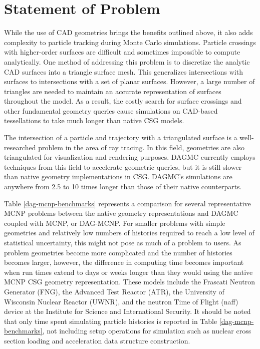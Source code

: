 \section{Statement of Problem}\label{sec:problem-statement}

While the use of CAD geometries brings the benefits outlined above, it also adds
complexity to particle tracking during Monte Carlo simulations. Particle
crossings with higher-order surfaces are difficult and sometimes impossible to
compute analytically. One method of addressing this problem is to discretize the
analytic CAD surfaces into a triangle surface mesh. This generalizes
intersections with surfaces to intersections with a set of planar
surfaces. However, a large number of triangles are needed to maintain an
accurate representation of surfaces throughout the model. As a result, the
costly search for surface crossings and other fundamental geometry
queries cause simulations on CAD-based tessellations
to take much longer than native CSG models.

The intersection of a particle and trajectory with a triangulated surface is a
well-researched problem in the area of ray tracing. In this field, geometries
are also triangulated for visualization and rendering purposes. DAGMC currently
employs techniques from this field to accelerate geometric queries, but it is
still slower than native geometry implementations in CSG. DAGMC's simulations
are anywhere from 2.5 to 10 times longer than those of their native
counterparts.

Table \ref{dag-mcnp-benchmarks} represents a comparison for several
representative MCNP problems between the native geometry representations and
DAGMC coupled with MCNP, or DAG-MCNP. For smaller problems with simple
geometries and relatively low numbers of histories required to reach a low level
of statistical uncertainty, this might not pose as much of a problem to
users. As problem geometries become more complicated and the number of histories
becomes larger, however, the difference in computing time becomes important when
run times extend to days or weeks longer than they would using the native MCNP
CSG geometry representation. These models include the Frascati Neutron Generator
(FNG), the Advanced Test Reactor (ATR), the University of Wisconsin Nuclear
Reactor (UWNR), and the neutron Time of Flight (naff) device at the Institute
for Science and International Security. It should be noted that only time spent
simulating particle histories is reported in Table \ref{dag-mcnp-benchmarks},
not including setup operations for simulation such as nuclear cross section
loading and acceleration data structure construction.

